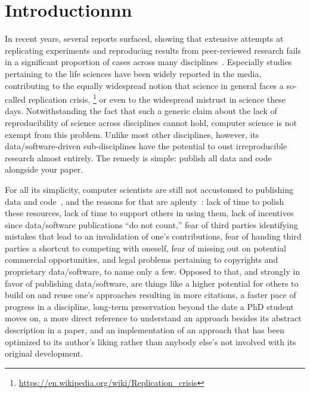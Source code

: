 \section{Introductionnn}

In recent years, several reports surfaced, showing that extensive attempts at replicating experiments and reproducing results from peer-reviewed research fails in a significant proportion of cases across many disciplines~\cite{ionnadis:2005,anderson:2017}. Especially studies pertaining to the life sciences have been widely reported in the media, contributing to the equally widespread notion that science in general faces a so-called replication crisis,%
\footnote{\scriptsize\url{https://en.wikipedia.org/wiki/Replication_crisis}}
or even to the widespread mistrust in science these days. Notwithstanding the fact that such a generic claim about the lack of reproducibility of science across disciplines cannot hold, computer science is not exempt from this problem. Unlike most other disciplines, however, its data/software-driven sub-disciplines have the potential to oust irreproducible research almost entirely. The remedy is simple: publish all data and code alongside your paper.

For all its simplicity, computer scientists are still not accustomed to publishing data and code~\cite{collberg:2015}, and the reasons for that are aplenty~\cite{stodden:2010}: lack of time to polish these resources, lack of time to support others in using them, lack of incentives since data/software publications ``do not count,'' fear of third parties identifying mistakes that lead to an invalidation of one's contributions, fear of handing third parties a shortcut to competing with oneself, fear of missing out on potential commercial opportunities, and legal problems pertaining to copyrights and proprietary data/software, to name only a few.
Opposed to that, and strongly in favor of publishing data/software, are things like a higher potential for others to build on and reuse one's approaches resulting in more citations, a faster pace of progress in a discipline, long-term preservation beyond the date a PhD student moves on, a more direct reference to understand an approach besides its abstract description in a paper, and an implementation of an approach that has been optimized to its author's liking rather than anybody else's not involved with its original development.

